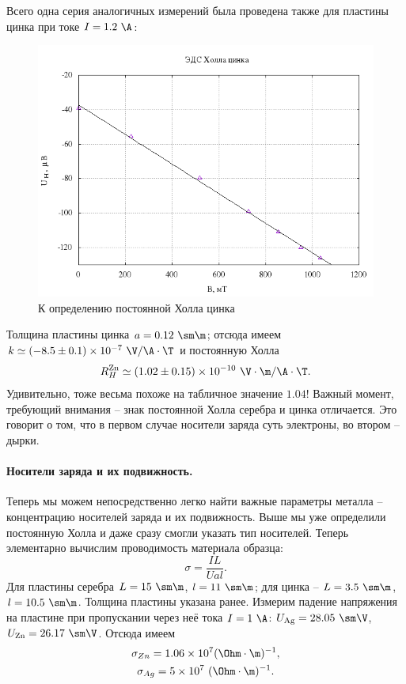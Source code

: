 \documentclass{../lab_class}
\begin{document}
Всего одна серия аналогичных измерений была проведена также для пластины цинка при токе $I = 1.2 \ \A$:
\begin{figure}[H]
	\centering
	\includegraphics[width = 0.6 \textwidth]{zinc.png}
	\caption{К определению постоянной Холла цинка}
\end{figure}

\pagebreak

Толщина пластины цинка $a = 0.12 \ \sm \m$; отсюда имеем $k \simeq (-8.5 \pm 0.1) \times 10^{-7} \ \V / \A \cdot \T$ и постоянную Холла
\begin{gather*}
	R_H^{\text{Zn}} \simeq (1.02 \pm 0.15) \times 10^{-10} \ \V \cdot \m / \A \cdot \T.
\end{gather*}
Удивительно, тоже весьма похоже на табличное значение $1.04$! Важный момент, требующий внимания -- знак постоянной Холла серебра и цинка отличается. Это говорит о том, что в первом случае носители заряда суть электроны, во втором -- дырки.

\paragraph{Носители заряда и их подвижность.}
Теперь мы можем непосредственно легко найти важные параметры металла -- концентрацию носителей заряда и их подвижность. Выше мы уже определили постоянную Холла и даже сразу смогли указать тип носителей. Теперь элементарно вычислим проводимость материала образца:
\begin{equation*}
	\sigma = \frac{I L}{U a l}.
\end{equation*}
Для пластины серебра $L = 15 \ \sm \m$, $l = 11 \ \sm \m$; для цинка -- $L = 3.5 \ \sm \m$, $l = 10.5 \ \sm \m$. Толщина пластины указана ранее. Измерим падение напряжения на пластине при пропускании через неё тока $I = 1 \ \A$: $U_{\text{Ag}} = 28.05 \ \sm \V$, $U_{\text{Zn}} = 26.17 \ \sm \V$. Отсюда имеем
\begin{gather*}
	\sigma_{Zn} = 1.06 \times 10^7 (\Ohm \cdot \m)^{-1}, \\
	\sigma_{Ag} = 5 \times 10^7 \ (\Ohm \cdot \m)^{-1}.
\end{gather*}
\end{document}
